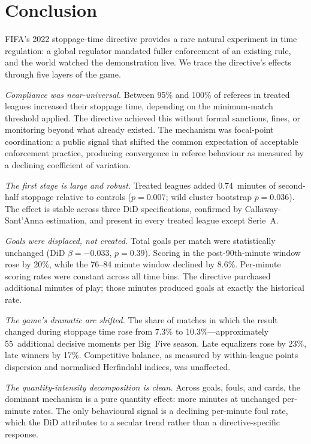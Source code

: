 
\section{Conclusion}
\label{sec:conclusion}

FIFA's 2022 stoppage-time directive provides a rare natural
experiment in time regulation: a global regulator mandated fuller
enforcement of an existing rule, and the world watched the
demonstration live. We trace the directive's effects through five
layers of the game.

\textit{Compliance was near-universal.} Between 95\% and 100\% of
referees in treated leagues increased their stoppage time, depending
on the minimum-match threshold applied. The directive achieved this
without formal sanctions, fines, or monitoring beyond what already
existed. The mechanism was focal-point coordination: a public signal
that shifted the common expectation of acceptable enforcement
practice, producing convergence in referee behaviour as measured by
a declining coefficient of variation.

\textit{The first stage is large and robust.} Treated leagues added
0.74~minutes of second-half stoppage relative to controls ($p =
0.007$; wild cluster bootstrap $p = 0.036$). The effect is stable
across three DiD specifications, confirmed by Callaway-Sant'Anna
estimation, and present in every treated league except Serie~A.

\textit{Goals were displaced, not created.} Total goals per match
were statistically unchanged (DiD $\beta = -0.033$, $p = 0.39$).
Scoring in the post-90th-minute window rose by 20\%, while the
76--84 minute window declined by 8.6\%. Per-minute scoring rates
were constant across all time bins. The directive purchased
additional minutes of play; those minutes produced goals at exactly
the historical rate.

\textit{The game's dramatic arc shifted.} The share of matches in
which the result changed during stoppage time rose from 7.3\% to
10.3\%---approximately 55~additional decisive moments per Big~Five
season. Late equalizers rose by 23\%, late winners by 17\%.
Competitive balance, as measured by within-league points dispersion
and normalised Herfindahl indices, was unaffected.

\textit{The quantity-intensity decomposition is clean.} Across
goals, fouls, and cards, the dominant mechanism is a pure quantity
effect: more minutes at unchanged per-minute rates. The only
behavioural signal is a declining per-minute foul rate, which the
DiD attributes to a secular trend rather than a directive-specific
response.

